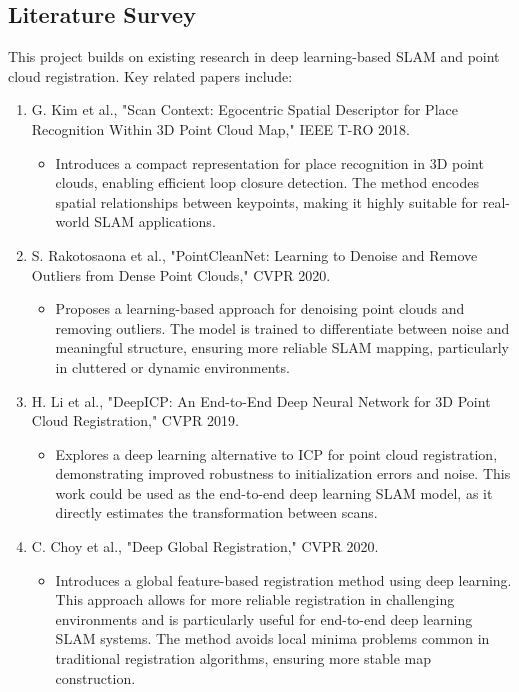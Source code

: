 \documentclass[nonanonymous]{article}
\begin{document}
\subsection*{Literature Survey}
This project builds on existing research in deep learning-based SLAM and point cloud registration.
Key related papers include:

\begin{enumerate}
\item G. Kim et al., "Scan Context: Egocentric Spatial Descriptor for Place Recognition Within 3D Point Cloud Map," IEEE T-RO 2018.

\begin{itemize}
\item Introduces a compact representation for place recognition in 3D point clouds, enabling efficient loop closure detection.
The method encodes spatial relationships between keypoints, making it highly suitable for real-world SLAM applications.


\end{itemize}

\item S. Rakotosaona et al., "PointCleanNet: Learning to Denoise and Remove Outliers from Dense Point Clouds," CVPR 2020.

\begin{itemize}
\item Proposes a learning-based approach for denoising point clouds and removing outliers.
The model is trained to differentiate between noise and meaningful structure, ensuring more reliable SLAM mapping, particularly in cluttered or dynamic environments.


\end{itemize}

\item H. Li et al., "DeepICP: An End-to-End Deep Neural Network for 3D Point Cloud Registration," CVPR 2019.

\begin{itemize}
\item Explores a deep learning alternative to ICP for point cloud registration, demonstrating improved robustness to initialization errors and noise.
This work could be used as the end-to-end deep learning SLAM model, as it directly estimates the transformation between scans.

\end{itemize}

\item C. Choy et al., "Deep Global Registration," CVPR 2020.

\begin{itemize}
\item Introduces a global feature-based registration method using deep learning.
This approach allows for more reliable registration in challenging environments and is particularly useful for end-to-end deep learning SLAM systems.
The method avoids local minima problems common in traditional registration algorithms, ensuring more stable map construction.

\end{itemize}

\end{enumerate}
\end{document}
